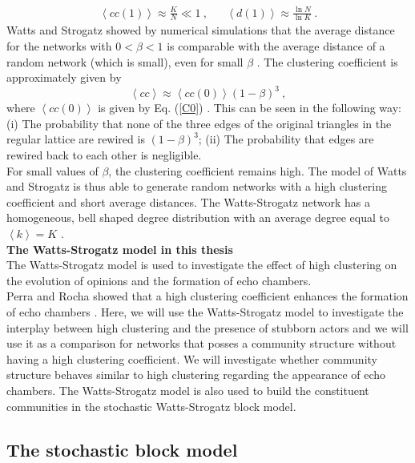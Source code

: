 \documentclass[11 pt , letterpaper , twoside , openright]{book}
\begin{document}
\begin{align}
	\left<cc(1)\right> \approx \frac{K}{N} \ll 1 \ , && \left<d(1)\right> \approx \frac{\ln{N}}{\ln{K}} \ .
\end{align}
Watts and Strogatz showed by numerical simulations that the average distance for the networks with $0 < \beta < 1$ is comparable with the average distance of a random network (which is small), even for small $\beta$ \cite{Newman2000}. The clustering coefficient is approximately given by
\begin{equation}
	\left<cc\right> \approx \left<cc(0)\right>(1-\beta)^3 \ ,
\end{equation} 
where $\left<cc(0)\right>$ is given by Eq. (\ref{C0}) \cite{Barrat1999}. This can be seen in the following way: (i) The probability that none of the three edges of the original triangles in the regular lattice are rewired is $(1-\beta)^3$; (ii) The probability that edges are rewired back to each other is negligible.\\
\newline
For small values of $\beta$, the clustering coefficient remains high. The model of Watts and Strogatz is thus able to generate random networks with a high clustering coefficient and short average distances. The Watts-Strogatz network has a homogeneous, bell shaped degree distribution with an average degree equal to $\left<k\right> = K$ \cite{Barrat1999}.\\
\newline
\textbf{The Watts-Strogatz model in this thesis}\\
\newline
The Watts-Strogatz model is used to investigate the effect of high clustering on the evolution of opinions and the formation of echo chambers.\\
\newline
Perra and Rocha showed that a high clustering coefficient enhances the formation of echo chambers \cite{Perra2019}. Here, we will use the Watts-Strogatz model to investigate the interplay between high clustering and the presence of stubborn actors and we will use it as a comparison for networks that posses a community structure without having a high clustering coefficient. We will investigate whether community structure behaves similar to high clustering regarding the appearance of echo chambers. The Watts-Strogatz model is also used to build the constituent communities in the stochastic Watts-Strogatz block model.

\subsection{The stochastic block model}
\end{document}
